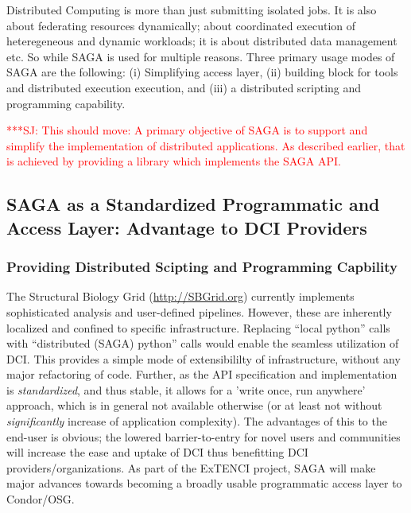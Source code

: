 \documentclass[12pt]{article}
\newcommand{\jhanote}[1]{ {\textcolor{red}     {***SJ: #1}}}
\newcommand{\jhanote}[1]{}
\newcommand{\I}[1]{\textit{#1}}
\begin{document}
Distributed Computing is more than just submitting isolated jobs.  It
is also about federating resources dynamically; about coordinated
execution of heteregeneous and dynamic workloads; it is about
distributed data management etc. So while SAGA is used for multiple reasons. Three primary usage modes of SAGA
are the following: (i) Simplifying access layer, (ii) building block
for tools and distributed execution execution, and (iii) a distributed
scripting and programming capability.


\jhanote{This should move: A primary objective of SAGA is to support
  and simplify the implementation of distributed applications.  As
  described earlier, that is achieved by providing a library which
  implements the SAGA API.}


\subsection{SAGA as a Standardized Programmatic and Access Layer:
  Advantage to DCI Providers}

\subsubsection*{Providing Distributed Scipting and Programming Capbility}
The Structural Biology Grid (\url{http://SBGrid.org}) currently
implements sophisticated analysis and user-defined pipelines. However,
these are inherently localized and confined to specific
infrastructure.  Replacing ``local python'' calls with ``distributed
(SAGA) python'' calls would enable the seamless utilization of
DCI. This provides a simple mode of extensibililty of infrastructure,
without any major refactoring of code. Further, as the API
specification and implementation is \I{standardized}, and thus stable,
it allows for a 'write once, run anywhere' approach, which is in
general not available otherwise (or at least not without
\I{significantly} increase of application complexity).  The advantages
of this to the end-user is obvious; the lowered barrier-to-entry for
novel users and communities will increase the ease and uptake of DCI
thus benefitting DCI providers/organizations.  As part of the ExTENCI
project, SAGA will make major advances towards becoming a broadly
usable programmatic access layer to Condor/OSG.
\end{document}
